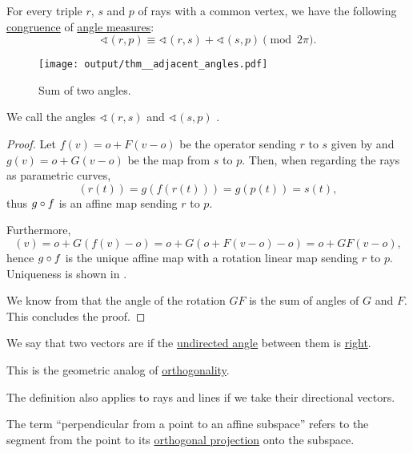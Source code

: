 \begin{proposition}\label{thm:adjacent_angles}
  For every triple \( r \), \( s \) and \( p \) of rays with a common vertex, we have the following \hyperref[rem:congruence_modulo_real_number]{congruence} of \hyperref[def:angle/measure]{angle measures}:
  \begin{equation*}
    \sphericalangle(r, p) \equiv \sphericalangle(r, s) + \sphericalangle(s, p) \pmod {2\pi}.
  \end{equation*}

  \begin{figure}[!ht]
    \centering
    \texttt{[image: output/thm\_\_adjacent\_angles.pdf]}
    \caption{Sum of two angles.}\label{fig:thm:adjacent_angles}
  \end{figure}

  We call the angles \( \sphericalangle(r, s) \) and \( \sphericalangle(s, p) \) .
\end{proposition}
\begin{proof}
  Let \( f(v) = o + F(v - o) \) be the operator sending \( r \) to \( s \) given by  and \( g(v) = o + G(v - o) \) be the map from \( s \) to \( p \). Then, when regarding the rays as parametric curves,
  \begin{equation*}
    [g \bincirc f](r(t)) = g(f(r(t))) = g(p(t)) = s(t),
  \end{equation*}
  thus \( g \bincirc f \) is an affine map sending \( r \) to \( p \).

  Furthermore,
  \begin{equation*}
    [g \bincirc f](v)
    =
    o + G(f(v) - o)
    =
    o + G(o + F(v - o) - o)
    =
    o + GF(v - o),
  \end{equation*}
  hence \( g \bincirc f \) is the unique affine map with a rotation linear map sending \( r \) to \( p \). Uniqueness is shown in .

  We know from  that the angle of the rotation \( GF \) is the sum of angles of \( G \) and \( F \). This concludes the proof.
\end{proof}

\begin{definition}\label{def:perpendicularity}\mimprovised
  We say that two vectors are  if the \hyperref[def:undirected_angle]{undirected angle} between them is \hyperref[def:angle/measure/right]{right}.

  This is the geometric analog of \hyperref[def:orthogonality]{orthogonality}.

  The definition also applies to rays and lines if we take their directional vectors.

  The term \enquote{perpendicular from a point to an affine subspace} refers to the segment from the point to its \hyperref[def:orthogonal_projection]{orthogonal projection} onto the subspace.
\end{definition}

